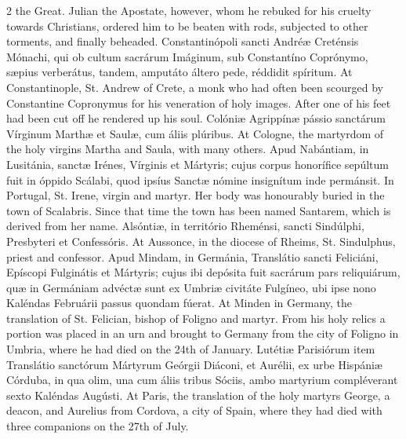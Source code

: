 \begin{paracol}{2}
 the Great. Julian the Apostate, however, whom he rebuked for his 
 cruelty towards Christians, ordered him to be beaten with rods, subjected to 
 other torments, and finally beheaded.
\switchcolumn*
{}
Constantinópoli sancti 
 Andréæ Creténsis Mónachi, qui ob cultum sacrárum Imáginum, sub Constantíno 
 Coprónymo, sæpius verberátus, tandem, amputáto áltero pede, réddidit 
 spíritum.
\switchcolumn
{}
At Constantinople, St. Andrew of 
 Crete, a monk who had often been scourged by Constantine Copronymus for his 
 veneration of holy images. After one of his feet had been cut off he 
 rendered up his soul.
\switchcolumn*
{}
Colóniæ Agrippínæ 
 pássio sanctárum Vírginum Marthæ et Saulæ, cum áliis plúribus.
\switchcolumn
{}
At Cologne, the martyrdom of the 
 holy virgins Martha and Saula, with many others.
\switchcolumn*
{}
Apud Nabántiam, in 
 Lusitánia, sanctæ Irénes, Vírginis et Mártyris; cujus corpus honorífice 
 sepúltum fuit in óppido Scálabi, quod ipsíus Sanctæ nómine insign\'itum inde 
 permánsit.
\switchcolumn
{}
In Portugal, St. Irene, virgin and 
 martyr. Her body was honourably buried in the town of Scalabris. 
 Since that time the town has been named Santarem, which is derived from her 
 name.
\switchcolumn*
{}
Alsóntiæ, in território 
 Rheménsi, sancti Sindúlphi, Presbyteri et Confessóris.
\switchcolumn
{}
At Aussonce, in the diocese of 
 Rheims, St. Sindulphus, priest and confessor.
\switchcolumn*
{}
Apud Mindam, in 
 Germánia, Translátio sancti Feliciáni, Epíscopi Fulginátis et Mártyris; 
 cujus ibi depósita fuit sacrárum pars reliquiárum, quæ in Germániam advéctæ 
 sunt ex Umbriæ civitáte Fulgíneo, ubi ipse nono Kaléndas Februárii passus 
 quondam fúerat.
\switchcolumn
{}
At Minden in Germany, the 
 translation of St. Felician, bishop of Foligno and martyr. From his 
 holy relics a portion was placed in an urn and brought to Germany from the 
 city of Foligno in Umbria, where he had died on the 24th of January.
\switchcolumn*
{}
Lutétiæ Parisiórum item 
 Translátio sanctórum Mártyrum Geórgii Diáconi, et Aurélii, ex urbe Hispániæ 
 Córduba, in qua olim, una cum áliis tribus Sóciis, ambo martyrium 
 compléverant sexto Kaléndas Augústi.
\switchcolumn
{}
At Paris, the translation of the 
 holy martyrs George, a deacon, and Aurelius from Cordova, a city of Spain, 
 where they had died with three companions on the 27th of July.
\switchcolumn*
{}
\end{paracol}


